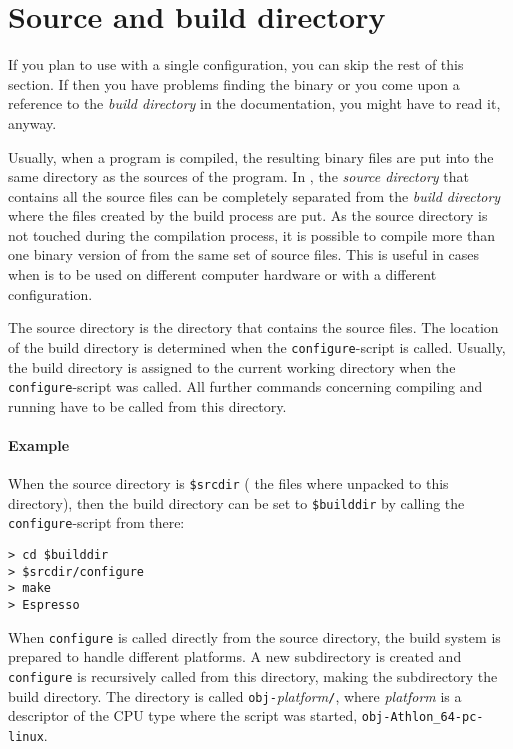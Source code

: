 \section{Source and build directory}
\label{sec:builddir}
 

If you plan to use \es{} with a single configuration, you can skip the
rest of this section. If then you have problems finding the \es{}
binary or you come upon a reference to the \emph{build directory} in
the documentation, you might have to read it, anyway. 

Usually, when a program is compiled, the resulting binary files are
put into the same directory as the sources of the program. In \es{},
the \emph{source directory} that contains all the source files can be
completely separated from the \emph{build directory} where the files
created by the build process are put. As the source directory is not
touched during the compilation process, it is possible to compile more
than one binary version of \es{} from the same set of source files.
This is useful in cases when \es{} is to be used on different computer
hardware or with a different configuration.

The source directory is the directory that contains the source files.
The location of the build directory is determined when the
\texttt{configure}-script is called.  Usually, the build directory is
assigned to the current working directory when the
\texttt{configure}-script was called. All further commands concerning
compiling and running \es{} have to be called from this directory.

\paragraph{Example}
When the source directory is \texttt{\$srcdir} (\ie{} the files where
unpacked to this directory), then the build directory can be set to
\texttt{\$builddir} by calling the \texttt{configure}-script from
there:
\begin{verbatim}
> cd $builddir
> $srcdir/configure
> make
> Espresso
\end{verbatim}

When \texttt{configure} is called directly from the source directory,
the \es{} build system is prepared to handle different platforms.  A
new subdirectory is created and \texttt{configure} is recursively
called from this directory, making the subdirectory the build
directory.  The directory is called
\texttt{obj-}\textit{platform}\texttt{/}, where \textit{platform} is a
descriptor of the CPU type where the script was started, \eg{}
\texttt{obj-Athlon\_64-pc-linux}.

